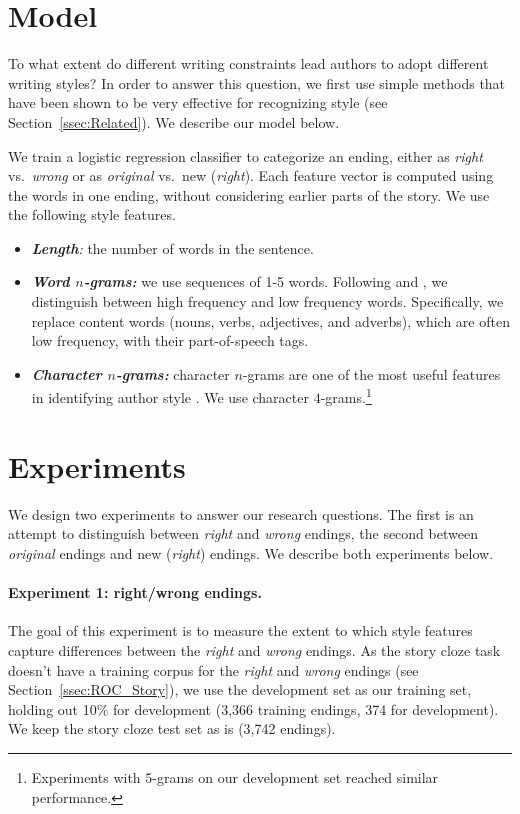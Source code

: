 \documentclass[11pt,a4paper]{article}
\newcommand{\secref}[1]{Section~\ref{ssec:#1}}
\newcommand{\isectionb}[1]{\section{#1}\label{ssec:#1}}
\newcommand{\roy}[1]{{\color{orange}\textsc{[#1 --rs]}}}
\renewcommand{\roy}[1]{{\color{orange}[#1 --rs]}}
\renewcommand{\roy}[1]{#1}
\begin{document}
\isectionb{Model}

To what extent do
different writing constraints lead authors to adopt different writing styles?
In order to answer this question, we first use simple methods that have been shown to be very effective for recognizing style (see \secref{Related}).
We describe our model below.

We train a logistic regression classifier to categorize an ending,
either as {\it right} vs.~{\it wrong} or as {\it original} vs.~new ({\it right}).
Each feature vector is computed using the words in one ending, without considering earlier parts of the story. 
We use the following style features.

\begin{itemize}
\item\textit{\textbf{Length}:} the number of words in the sentence.
\item\textit{\textbf{Word $n$-grams:}} we use sequences of 1-5
  words. Following \citet{Tsur:2010} and \citet{Schwartz:2013}, we distinguish between high frequency and low frequency words. 
Specifically, we replace content words (nouns, verbs, adjectives, and adverbs), which are often low frequency, with their part-of-speech tags.
\item\textit{\textbf{Character $n$-grams:}} character $n$-grams are one of the most useful features in identifying author style \cite{Stamatatos:2009}. 
We use character $4$-grams.\footnote{\roy{Experiments with $5$-grams on our development set reached similar performance.}}
\end{itemize}

\isectionb{Experiments}
We design two experiments to answer our research questions. 
The first is an attempt to distinguish between {\it right} and {\it wrong} endings,
the second  between {\it original} endings and new ({\it right}) endings.
We describe both experiments below.

\paragraph{Experiment 1: right/wrong endings.}
The goal of this experiment is to measure the extent to which  style features capture differences between the {\it right} and {\it wrong} endings.
As the story cloze task doesn't have a training corpus for the {\it
  right} and {\it wrong} endings (see \secref{ROC_Story}), we use the
development set as our training set, holding out 10\% for development
(3,366 training endings, 374 for development). 
 We keep the story cloze test set as is (3,742 endings).
\end{document}
